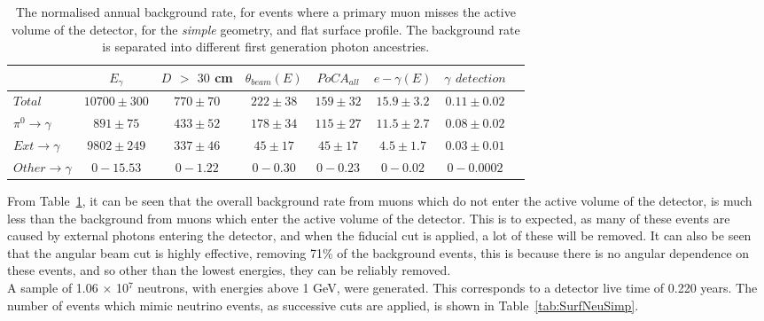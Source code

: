 \begin{table}[h!]
  \caption[The normalised annual background rate, for events where a primary muon misses the active volume of the detector, for the \emph{simple} geometry, and flat surface profile]
          {The normalised annual background rate, for events where a primary muon misses the active volume of the detector, for the \emph{simple} geometry, and flat surface profile. The background rate is separated into different first generation photon ancestries.}
  \label{tab:SurfMuMissSimp}
  \centering
  \scriptsize
  \begin{tabular}{l c c c c c c c }
    \toprule
        & $E_\gamma$ &  $D$ $>$ $30$ cm & $\theta_{beam}(E)$ & $PoCA_{all}$ & $e-\gamma(E)$ & $\gamma$ $detection$ \\
        \midrule
        $Total$          & $10700\pm300$ & $770\pm70$ & $222\pm38$ & $159\pm32$ & $15.9\pm3.2$ & $0.11\pm0.02$ \\

        $\pi^0\to\gamma$ & $891\pm75$      & $433\pm52$ & $178\pm34$ & $115\pm27$ & $11.5\pm2.7$ & $0.08\pm0.02$ \\

        $Ext\to\gamma$   & $9802\pm249$  & $337\pm46$ & $45\pm17$  & $45\pm17$  & $4.5\pm1.7$  & $0.03\pm0.01$ \\

        $Other\to\gamma$ & $0-15.53$     & $0-1.22$   & $0-0.30$   & $0-0.23$   & $0-0.02$     & $0-0.0002$ \\
        \bottomrule
  \end{tabular}
\end{table}

From Table~\ref{tab:SurfMuMissSimp}, it can be seen that the overall background rate from muons which do not enter the active volume of the detector, is much less than the background from muons which enter the active volume of the detector. This is to expected, as many of these events are caused by external photons entering the detector, and when the fiducial cut is applied, a lot of these will be removed. It can also be seen that the angular beam cut is highly effective, removing 71\% of the background events, this is because there is no angular dependence on these events, and so other than the lowest energies, they can be reliably removed. \\ 

A sample of 1.06 $\times$ 10$^{7}$ neutrons, with energies above 1 GeV, were generated. This corresponds to a detector live time of 0.220 years. The number of events which mimic neutrino events, as successive cuts are applied, is shown in Table~\ref{tab:SurfNeuSimp}. \\

